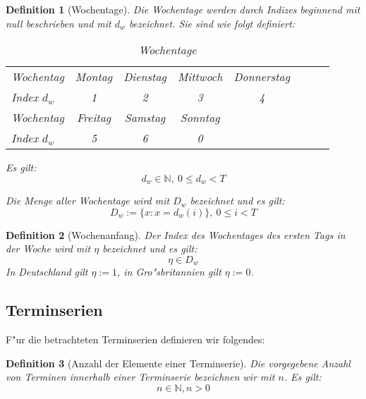 \documentclass[a4paper]{article}
\numberwithin{equation}{section}
\newtheorem{dfn}{Definition}
\begin{document}
\begin{dfn}[Wochentage]\label{def:weekdays}
  Die Wochentage werden durch Indizes beginnend mit null beschrieben und mit
  $d_w$ bezeichnet. Sie sind wie folgt definiert:
  \par
  \begin{table}[ht]
  \caption{Wochentage}\label{tab:weekDays}
  \begin{tabularx}{\textwidth}{X|ccccccc}
    \hline
    Wochentag & Montag & Dienstag & Mittwoch & Donnerstag \\
    Index $d_w$ & 1 & 2 & 3 & 4 \\
    \hline
    Wochentag & Freitag & Samstag & Sonntag & \\
    Index $d_w$ & 5 & 6 & 0 & \\
    \hline
  \end{tabularx}\end{table}
  \par
  \noindent Es gilt:
  \begin{equation}d_w \in \mathbb{N},\ 0 \le d_w < T\end{equation}
  \par
  \noindent Die Menge aller Wochentage wird mit $D_w$ bezeichnet und es gilt:
  \begin{equation}D_w := \{ x : x = d_w(i) \},\ 0 \le i < T\end{equation}
\end{dfn}

\begin{dfn}[Wochenanfang]
  Der Index des Wochentages des ersten Tags in der Woche wird mit $\eta$
  bezeichnet und es gilt:
  \begin{equation}\eta \in D_w\end{equation}
  In Deutschland gilt $\eta := 1$, in Gro"sbritannien gilt
  $\eta := 0$.
\end{dfn}


%
%
\subsection{Terminserien}
F"ur die betrachteten Terminserien definieren wir folgendes:

\begin{dfn}[Anzahl der Elemente einer Terminserie]\label{def:numOfElements}
  Die vorgegebene Anzahl von Terminen innerhalb einer Terminserie bezeichnen wir
  mit $n$. Es gilt:
  \begin{equation}n \in \mathbb{N}, n > 0\end{equation}
\end{dfn}
\end{document}

